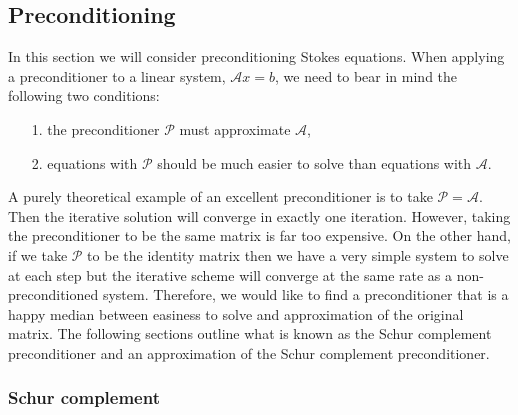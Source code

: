 \documentclass[11pt]{article}
\numberwithin{equation}{section}    %
\begin{document}
\subsection{Preconditioning} \label{sec:precond}

In this section we will  consider preconditioning Stokes equations. When applying a preconditioner to a linear system, $\mathcal{A} x = b$, we need to bear in mind the following two conditions:
\begin{itemize}
    \item[1.] the preconditioner $\mathcal{P}$ must approximate $\mathcal{A}$,
    \item[2.] equations with $\mathcal{P}$ should be much easier to solve than equations with $\mathcal{A}$.
\end{itemize}
A purely theoretical example of an excellent preconditioner is to take $\mathcal{P} = \mathcal{A}$. Then the iterative solution will converge in exactly one iteration. However, taking the preconditioner to be the same matrix is far too expensive. On the other hand, if we take $\mathcal{P}$ to be the identity matrix then we have a very simple system to solve at each step but the iterative scheme will converge at the same rate as a non-preconditioned system. Therefore, we would like to find a preconditioner that is a happy median between easiness to solve and approximation of the original matrix. The following sections outline what is known as the Schur complement preconditioner and an approximation of the Schur complement preconditioner.

\subsubsection{Schur complement } \label{sec:schur}
\end{document}
